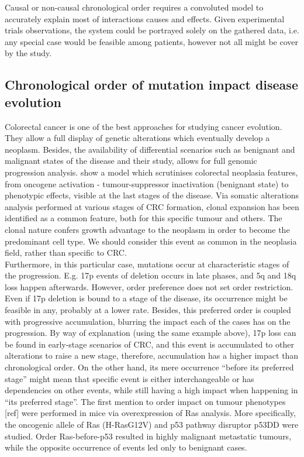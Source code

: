 
Causal or non-causal chronological order requires a convoluted model to accurately explain most of interactions causes and effects. Given experimental trials observations, the system could be portrayed solely on the gathered data, i.e. any special case would be feasible among patients, however not all might be cover by the study.

\subsection{Chronological order of mutation impact disease evolution}
Colorectal cancer is one of the best approaches for studying cancer evolution. They allow a full display of genetic alterations which eventually develop a neoplasm. Besides, the availability of differential scenarios such as benignant and malignant states of the disease and their study, allows for full genomic progression analysis. \cite{Fearon1990ATumorigenesis} show a model which scrutinises colorectal neoplasia features, from oncogene activation - tumour-suppressor inactivation (benignant state) to phenotypic effects, visible at the last stages of the disease.
Via somatic alterations analysis performed at various stages of CRC formation, clonal expansion has been identified as a common feature, both for this specific tumour and others. The clonal nature confers growth advantage to the neoplasm in order to become the predominant cell type. We should consider this event as common in the neoplasia field, rather than specific to CRC.
\\

Furthermore, in this particular case, mutations occur at characteristic stages of the progression. E.g. 17p events of deletion occurs in late phases, and 5q and 18q loss happen afterwards. However, order preference does not set order restriction. Even if 17p deletion is bound to a stage of the disease, its occurrence might be feasible in any, probably at a lower rate. Besides, this preferred order is coupled with progressive accumulation, blurring the impact each of the cases has on the progression. By way of explanation (using the same example above), 17p loss can be found in early-stage scenarios of CRC, and this event is accumulated to other alterations to raise a new stage,  therefore, accumulation has a higher impact than chronological order. On the other hand, its mere occurrence “before its preferred stage” might mean that specific event is either interchangeable or has dependencies on other events, while still having a high impact when happening in “its preferred stage”.
The first mention to order impact on tumour phenotypes [ref] were performed in mice via overexpression of Ras analysis. More specifically, the oncogenic allele of Ras (H-RasG12V) and p53 pathway disruptor p53DD were studied. Order Ras-before-p53 resulted in highly malignant metastatic tumours, while the opposite occurrence of events led only to benignant cases.
\\

